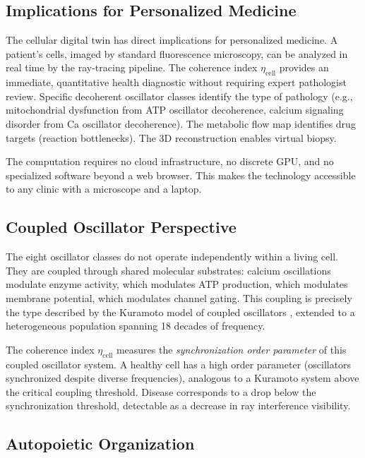 \documentclass[11pt,twocolumn,a4paper]{article}
\newcommand{\etacell}{\eta_{\mathrm{cell}}}
\begin{document}
\subsection{Implications for Personalized Medicine}

The cellular digital twin has direct implications for personalized
medicine. A patient's cells, imaged by standard fluorescence microscopy,
can be analyzed in real time by the ray-tracing pipeline. The coherence
index $\etacell$ provides an immediate, quantitative health diagnostic
without requiring expert pathologist review. Specific decoherent
oscillator classes identify the type of pathology (e.g., mitochondrial
dysfunction from ATP oscillator decoherence, calcium signaling disorder
from Ca oscillator decoherence). The metabolic flow map identifies
drug targets (reaction bottlenecks). The 3D reconstruction enables
virtual biopsy.

The computation requires no cloud infrastructure, no discrete GPU, and
no specialized software beyond a web browser. This makes the technology
accessible to any clinic with a microscope and a laptop.

\subsection{Coupled Oscillator Perspective}

The eight oscillator classes do not operate independently within a
living cell. They are coupled through shared molecular substrates:
calcium oscillations modulate enzyme activity, which modulates ATP
production, which modulates membrane potential, which modulates channel
gating. This coupling is precisely the type described by the Kuramoto
model of coupled oscillators \citep{kuramoto1975}, extended to a
heterogeneous population spanning 18 decades of frequency.

The coherence index $\etacell$ measures the \emph{synchronization
order parameter} of this coupled oscillator system. A healthy cell has
a high order parameter (oscillators synchronized despite diverse
frequencies), analogous to a Kuramoto system above the critical
coupling threshold. Disease corresponds to a drop below the
synchronization threshold, detectable as a decrease in ray
interference visibility.

\subsection{Autopoietic Organization}
\end{document}
